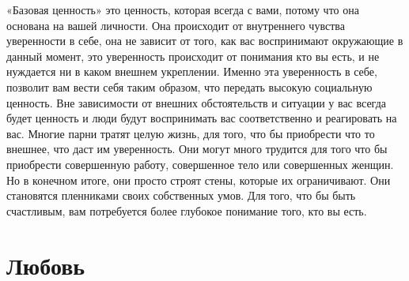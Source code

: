 «Базовая ценность» это ценность, которая всегда с вами, потому что она основана на вашей личности. Она происходит от внутреннего чувства уверенности в себе, она не зависит от того, как вас воспринимают окружающие в данный момент, это уверенность происходит от понимания кто вы есть, и не нуждается ни в каком внешнем укреплении. Именно эта уверенность в себе, позволит вам вести себя таким образом, что передать высокую социальную ценность. Вне зависимости от внешних обстоятельств и ситуации у вас всегда будет ценность и люди будут воспринимать вас соответственно и реагировать на вас. Многие парни тратят целую жизнь, для того, что бы приобрести что то внешнее, что даст им уверенность. Они могут много трудится для того что бы приобрести совершенную работу, совершенное тело или совершенных женщин. Но в конечном итоге, они просто строят стены, которые их ограничивают. Они становятся пленниками своих собственных умов. Для того, что бы быть счастливым, вам потребуется более глубокое понимание того, кто вы есть.

\chapter{Любовь}

